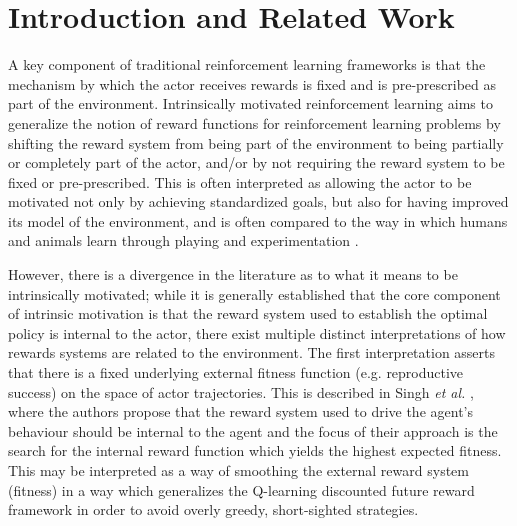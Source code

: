 \documentclass{article}
\begin{document}
\section{Introduction and Related Work}
A key component of traditional reinforcement learning frameworks is that the mechanism by which the actor receives rewards is fixed and is pre-prescribed as part of the environment.
Intrinsically motivated reinforcement learning aims to generalize the notion of reward functions for reinforcement learning problems by shifting the reward system from being part of the environment to being partially or completely part of the actor, and/or by not requiring the reward system to be fixed or pre-prescribed. This is often interpreted as allowing the actor to be motivated not only by achieving standardized goals, but also for having improved its model of the environment, and is often compared to the way in which humans and animals learn through playing and experimentation \citep{oudeyer2008can,schmidhuber2010formal}. 

However, there is a divergence in the literature as to what it means to be intrinsically motivated; while it is generally established that the core component of intrinsic motivation is that the reward system used to establish the optimal policy is internal to the actor, there exist multiple distinct interpretations of how rewards systems are related to the environment. The first interpretation asserts that there is a fixed underlying external fitness function (e.g. reproductive success) on the space of actor trajectories. This is described in Singh \textit{et al.} \cite{singh2010intrinsically}, where the authors propose that the reward system used to drive the agent's behaviour should be internal to the agent and the focus of their approach is the search for the internal reward function which yields the highest expected fitness. This may be interpreted as a way of smoothing the external reward system (fitness) in a way which generalizes the Q-learning discounted future reward framework in order to avoid overly greedy, short-sighted strategies. 
 
\end{document}
